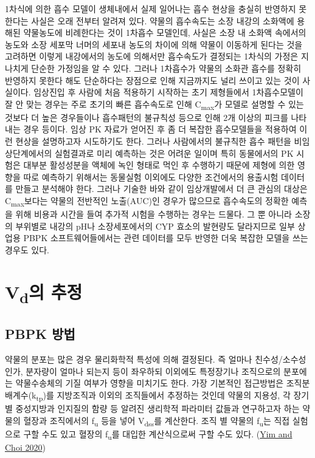 \documentclass[
  11pt,
  krantz2, a4paper, twoside]{krantz}
\begin{document}
1차식에 의한 흡수 모델이 생체내에서 실제 일어나는 흡수 현상을 충실히 반영하지 못한다는 사실은 오래 전부터 알려져 있다. 약물의 흡수속도는 소장 내강의 소화액에 용해된 약물농도에 비례한다는 것이 1차흡수 모델인데, 사실은 소장 내 소화액 속에서의 농도와 소장 세포막 너머의 세포내 농도의
차이에 의해 약물이 이동하게 된다는 것을 고려하면 이렇게 내강에서의
농도에 의해서만 흡수속도가 결정되는 1차식의 가정은 지나치게 단순한
가정임을 알 수 있다. 그러나 1차흡수가 약물의 소화관 흡수를 정확히
반영하지 못한다 해도 단순하다는 장점으로 인해 지금까지도 널리 쓰이고
있는 것이 사실이다. 임상진입 후 사람에 처음 적용하기 시작하는 초기
제형들에서 1차흡수모델이 잘 안 맞는 경우는 주로 초기의 빠른 흡수속도로
인해 C\textsubscript{max}가 모델로 설명할 수 있는 것보다 더 높은 경우들이나 흡수패턴의
불규칙성 등으로 인해 2개 이상의 피크를 나타내는 경우 등이다. 임상 PK
자료가 얻어진 후 좀 더 복잡한 흡수모델들을 적용하여 이런 현상을
설명하고자 시도하기도 한다. 그러나 사람에서의 불규칙한 흡수 패턴을
비임상단계에서의 실험결과로 미리 예측하는 것은 어려운 일이며 특히
동물에서의 PK 시험은 대부분 활성성분을 액체에 녹인 형태로 먹인 후
수행하기 때문에 제형에 의한 영향을 따로 예측하기 위해서는 동물실험
이외에도 다양한 조건에서의 용출시험 데이터를 만들고 분석해야 한다.
그러나 기술한 바와 같이 임상개발에서 더 큰 관심의 대상은 C\textsubscript{max}보다는
약물의 전반적인 노출(AUC)인 경우가 많으므로 흡수속도의 정확한 예측을
위해 비용과 시간을 들여 추가적 시험을 수행하는 경우는 드물다. 그 뿐
아니라 소장의 부위별로 내강의 pH나 소장세포에서의 CYP 효소의 발현량도
달라지므로 일부 상업용 PBPK 소프트웨어들에서는 관련 데이터를 모두 반영한
더욱 복잡한 모델을 쓰는 경우도 있다.

\hypertarget{vduxc758-uxcd94uxc815}{%
\section{\texorpdfstring{V\textsubscript{d}의 추정}{Vd의 추정}}\label{vduxc758-uxcd94uxc815}}

\hypertarget{pbpk-uxbc29uxbc95}{%
\subsection{PBPK 방법}\label{pbpk-uxbc29uxbc95}}

약물의 분포는 많은 경우 물리화학적 특성에 의해 결정된다. 즉 얼마나
친수성/소수성인가, 분자량이 얼마나 되는지 등이 좌우하되 이외에도
특정장기나 조직으로의 분포에는 약물수송체의 기질 여부가 영향을 미치기도
한다. 가장 기본적인 접근방법은 조직분배계수(k\textsubscript{tp})를 지방조직과 이외의
조직들에서 추정하는 것인데 약물의 지용성, 각 장기별 중성지방과 인지질의
함량 등 알려진 생리학적 파라미터 값들과 연구하고자 하는 약물의 혈장과
조직에서의 f\textsubscript{u} 등을 넣어 V\textsubscript{dss}를 계산한다. 조직 별 약물의 f\textsubscript{u}는 직접
실험으로 구할 수도 있고 혈장의 f\textsubscript{u}를 대입한 계산식으로써 구할 수도
있다. (\protect\hyperlink{ref-yim2020predicting}{Yim and Choi 2020})
\end{document}
